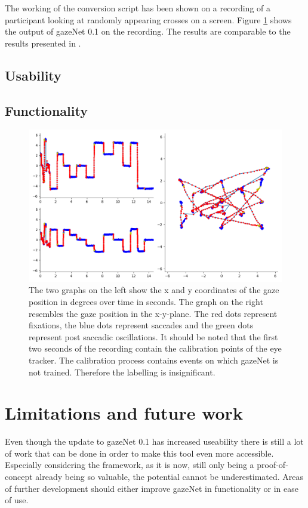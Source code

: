 \documentclass[acmlarge]{acmart}
\begin{document}
The working of the conversion script has been shown on a recording of a participant looking at randomly appearing crosses on a screen. Figure \ref{fig:kreuze} shows the output of gazeNet 0.1 on the recording. The results are comparable to the results presented in \cite{zemblys2018gazeNet}.

\subsection{Usability}

\subsection{Functionality}

\begin{figure}
    \caption{The two graphs on the left show the x and y coordinates of the gaze position in degrees over time in seconds. The graph on the right resembles the gaze position in the x-y-plane. The red dots represent fixations, the blue dots represent saccades and the green dots represent post saccadic oscillations. It should be noted that the first two seconds of the recording contain the calibration points of the eye tracker. The calibration process contains events on which gazeNet is not trained. Therefore the labelling is insignificant.}
    \label{fig:kreuze}
    \includegraphics[width=0.6\linewidth]
    {Kreuze_Random Recording1_short}
\end{figure}


\section{Limitations and future work}
Even though the update to gazeNet 0.1 has increased useability there is still a lot of work that can be done in order to make this tool even more accessible. Especially considering the framework, as it is now, still only being a proof-of-concept already being so valuable, the potential cannot be underestimated. Areas of further development should either improve gazeNet in functionality or in ease of use.
\end{document}
